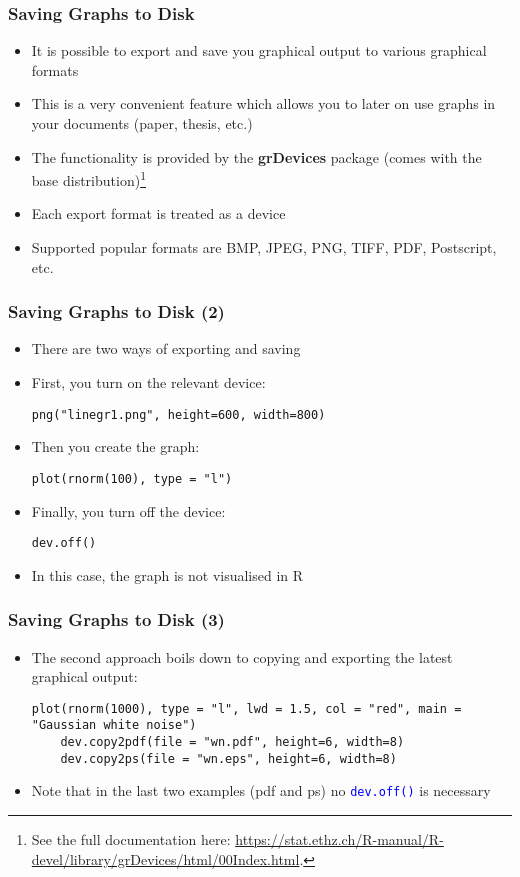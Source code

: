 \documentclass[10pt]{beamer}
\newcommand{\cc}[1]{\texttt{\textcolor{blue}{#1}}}
\theoremstyle{definition}
\begin{document}
\begin{frame}[fragile]
\frametitle{Saving Graphs to Disk}
\begin{itemize}
	\item It is possible to export and save you graphical output to various graphical formats
	\item This is a very convenient feature which allows you to later on use graphs in your documents (paper, thesis, etc.)
	\item The functionality is provided by the \textbf{grDevices} package (comes with the base distribution)\footnote{See the full documentation here: \url{https://stat.ethz.ch/R-manual/R-devel/library/grDevices/html/00Index.html}.}
	\item Each export format is treated as a device
	\item Supported popular formats are BMP, JPEG, PNG, TIFF, PDF, Postscript, etc.
\end{itemize}
\end{frame}

\begin{frame}[fragile]
\frametitle{Saving Graphs to Disk (2)}
\begin{itemize}
	\item There are two ways of exporting and saving
	\item First, you turn on the relevant device:
	\begin{lstlisting}[style = rstyle, breaklines]
	png("linegr1.png", height=600, width=800)
	\end{lstlisting}
	\item Then you create the graph:
	\begin{lstlisting}[style = rstyle, breaklines]
	plot(rnorm(100), type = "l")
	\end{lstlisting}
	\item Finally, you turn off the device:
	\begin{lstlisting}[style = rstyle, breaklines]
	dev.off()
	\end{lstlisting}
	\item In this case, the graph is not visualised in R
\end{itemize}
\end{frame}

\begin{frame}[fragile]
\frametitle{Saving Graphs to Disk (3)}
\begin{itemize}
	\item The second approach boils down to copying and exporting the latest graphical output:
	\begin{lstlisting}[style = rstyle, breaklines]
	plot(rnorm(1000), type = "l", lwd = 1.5, col = "red", main = "Gaussian white noise")
	dev.copy2pdf(file = "wn.pdf", height=6, width=8)
	dev.copy2ps(file = "wn.eps", height=6, width=8)
	\end{lstlisting}
	\item Note that in the last two examples (pdf and ps) no \cc{dev.off()} is necessary
\end{itemize}
\end{frame}
\end{document}
